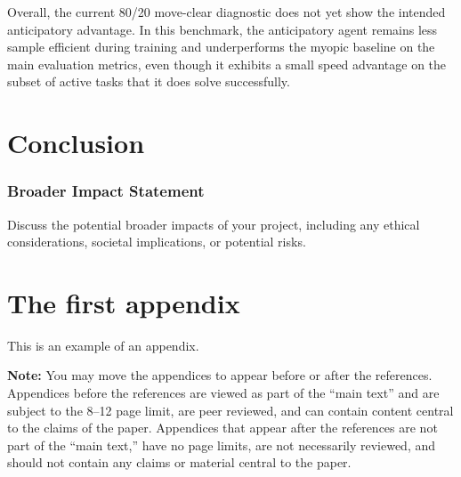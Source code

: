 \documentclass[10pt]{article} %
\begin{document}
Overall, the current 80/20 move-clear diagnostic does not yet show the intended anticipatory advantage. In this benchmark, the anticipatory agent remains less sample efficient during training and underperforms the myopic baseline on the main evaluation metrics, even though it exhibits a small speed advantage on the subset of active tasks that it does solve successfully.


\section{Conclusion}
\label{sec:conclusion}

\subsubsection*{Broader Impact Statement}
\label{sec:broaderImpact}
Discuss the potential broader impacts of your project, including any ethical considerations, societal implications, or potential risks.






\appendix

\section{The first appendix}
\label{sec:appendix1}
This is an example of an appendix. 

\noindent \textbf{Note:} You may move the appendices to appear before or after the references. Appendices before the references are viewed as part of the ``main text'' and are subject to the 8--12 page limit, are peer reviewed, and can contain content central to the claims of the paper. Appendices that appear after the references are not part of the ``main text,'' have no page limits, are not necessarily reviewed, and should not contain any claims or material central to the paper.
\end{document}
